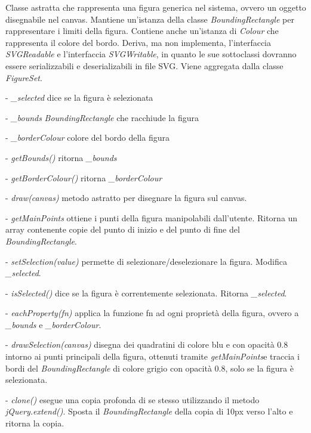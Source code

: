 Classe astratta che rappresenta una figura generica nel sistema, ovvero un oggetto disegnabile nel canvas.
Mantiene un'istanza della classe \textit{BoundingRectangle} per rappresentare i limiti della figura. Contiene anche un'istanza di \textit{Colour} che rappresenta il colore del bordo. Deriva, ma non implementa, l'interfaccia \textit{SVGReadable} e l'interfaccia \textit{SVGWritable}, in quanto le sue sottoclassi dovranno essere serializzabili e deserializabili in file SVG.
Viene aggregata dalla classe \textit{FigureSet}.
\begin{elencopuntato}[\subsubsecindent]
\item[-] \textit{{\_}selected} dice se la figura \`e selezionata
\item[-] \textit{{\_}bounds} \textit{BoundingRectangle} che racchiude la figura
\item[-] \textit{{\_}borderColour} colore del bordo della figura
\end{elencopuntato}
\begin{elencopuntato}[\subsubsecindent]
\item[-] \textit{getBounds()} ritorna \textit{{\_}bounds}
\item[-] \textit{getBorderColour()} ritorna \textit{{\_}borderColour}
\item[-]  \textit{draw(canvas)} metodo astratto per disegnare la figura sul canvas.
\item[-]  \textit{getMainPoints} ottiene i punti della figura manipolabili dall'utente. Ritorna un array contenente copie del punto di inizio e del punto di fine del \textit{BoundingRectangle}.
\item[-]  \textit{setSelection(value)} permette di selezionare/deselezionare la figura. Modifica \textit{{\_}selected}.
\item[-]  \textit{isSelected()} dice se la figura \`e correntemente selezionata. Ritorna \textit{{\_}selected}.
\item[-]  \textit{eachProperty(fn)} applica la funzione fn ad ogni propriet\`a della figura, ovvero a \textit{{\_}bounds} e \textit{{\_}borderColour}.
\item[-] \textit{drawSelection(canvas)} disegna dei quadratini di colore blu e con opacit\`a 0.8 intorno ai punti principali della figura, ottenuti tramite \textit{getMainPoints}e traccia i bordi del \textit{BoundingRectangle} di colore grigio con opacit\`a 0.8, solo se la figura \`e selezionata. 
\item[-] \textit{clone()} esegue una copia profonda di se stesso utilizzando il metodo \textit{jQuery.extend()}. Sposta il \textit{BoundingRectangle} della copia di 10px verso l'alto e ritorna la copia.
\end{elencopuntato}

